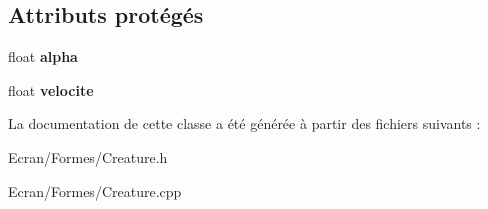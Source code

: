 \subsection*{Attributs protégés}
\begin{DoxyCompactItemize}
\item 
\mbox{\label{class_creature_aca600d3fcbeb29458e6db59ac7818bd6}} 
float {\bfseries alpha}
\item 
\mbox{\label{class_creature_abe23ee5336f9a80a6903e0167f486f41}} 
float {\bfseries velocite}
\end{DoxyCompactItemize}


La documentation de cette classe a été générée à partir des fichiers suivants \+:\begin{DoxyCompactItemize}
\item 
Ecran/\+Formes/Creature.\+h\item 
Ecran/\+Formes/Creature.\+cpp\end{DoxyCompactItemize}
